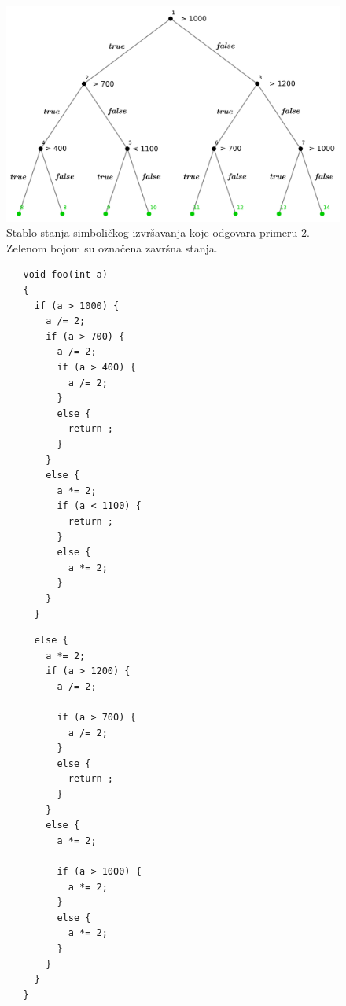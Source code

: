 \documentclass[12pt,oneside]{memoir}
\begin{document}
\begin{figure}[ht]
    \centering
    \includegraphics[width=\linewidth]{stablo_primer_1.png}
    \caption{Stablo stanja simboličkog izvršavanja koje odgovara primeru \ref{lst:primer_KLEE}. Zelenom bojom su označena završna stanja.}
    \label{fig:moj_primer}
\end{figure}

\begin{figure}
\noindent\begin{minipage}[t]{.45\textwidth}
\begin{lstlisting}
   void foo(int a) 
   {
     if (a > 1000) {
       a /= 2;
       if (a > 700) {
         a /= 2;
         if (a > 400) {
           a /= 2;
         }
         else {
           return ;
         }
       }
       else {
         a *= 2;
         if (a < 1100) {
           return ;
         }
         else {
           a *= 2;
         }
       }
     }
\end{lstlisting}
\end{minipage}\hfill
\begin{minipage}[t]{.45\textwidth}
\begin{lstlisting}
     else {
       a *= 2;
       if (a > 1200) {
         a /= 2;

         if (a > 700) {
           a /= 2;
         }
         else {
           return ;
         }
       }
       else {
         a *= 2;

         if (a > 1000) {
           a *= 2;
         }
         else {
           a *= 2;
         }
       }
     }
   }
\end{lstlisting}
\end{minipage}
\label{lst:primer_KLEE}
\end{figure}
\end{document}
